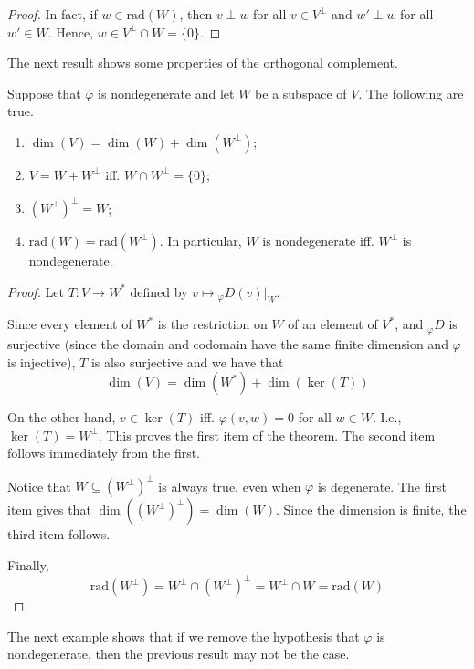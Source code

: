 \begin{proof}
In fact, if $w \in \text{rad}(W)$, then $v \perp w$ for all $v \in V^\perp$ and $w' \perp w$ for all $w' \in W$. Hence, $w \in V^\perp \cap W = \{ 0 \}$. 
\end{proof} 

The next result shows some properties of the orthogonal complement.

\begin{theorem}\label{thm:202212301122}
  Suppose that $\varphi$ is nondegenerate and let $W$ be a subspace of $V$. The following are true. 
  \begin{enumerate}
    \item $\dim(V) = \dim(W) + \dim(W^\perp)$;
    \item $V = W + W^\perp$ iff. $W \cap W^\perp = \{ 0 \}$;
    \item $(W^\perp)^\perp = W$;
    \item $\text{rad}(W) = \text{rad}(W^\perp)$. In particular, $W$ is nondegenerate iff. $W^\perp$ is nondegenerate. 
  \end{enumerate}
\end{theorem}

\begin{proof}
  Let $T : V \longrightarrow W^\ast$ defined by $v \longmapsto {}_\varphi D(v)|_W$. 

  Since every element of $W^\ast$ is the restriction on $W$ of an element of $V^\ast$, and ${}_\varphi D$ is surjective (since the domain and codomain have the same finite dimension and $\varphi$ is injective), $T$ is also surjective and we have that 
  \[
    \dim(V) = \dim(W^\ast) + \dim(\ker(T))
  \]

  On the other hand, $v \in \ker(T)$ iff. $\varphi(v,w) = 0$ for all $w \in W$. I.e., $\ker(T) = W^\perp$. This proves the first item of the theorem. The second item follows immediately from the first. 

  Notice that $W \subseteq (W^\perp)^\perp$ is always true, even when $\varphi$ is degenerate. The first item gives that $\dim((W^\perp)^\perp) = \dim(W)$. Since the dimension is finite, the third item follows. 

  Finally,
  \[
    \text{rad}(W^\perp) = W^\perp \cap (W^\perp)^\perp = W^\perp \cap W = \text{rad}(W)
  \]
\end{proof}

The next example shows that if we remove the hypothesis that $\varphi$ is nondegenerate, then the previous result may not be the case. 

